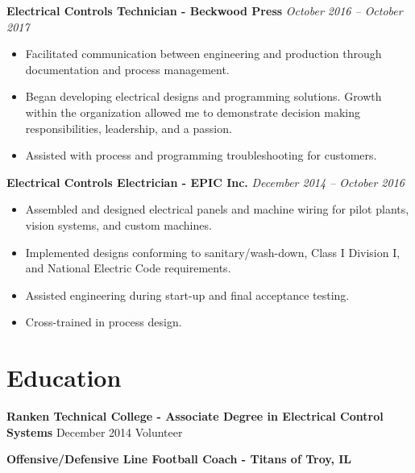 \documentclass[letterpaper,10pt]{article} %
\newcommand{\job}[3]{
\textbf{#1 - #2} \hfill \textit{#3}
}
\newcommand{\education}[4]{
  \textbf{#1 - #2} \hfill #3
}
\begin{document}
\noindent\job{Electrical Controls Technician}{Beckwood Press}{October 2016 – October 2017}
\begin{itemize}[left=2em]
	\item Facilitated communication between engineering and production through documentation and process management.
	\item Began developing electrical designs and programming solutions. Growth within the organization allowed me to demonstrate
	decision making responsibilities, leadership, and a passion.
	\item Assisted with process and programming troubleshooting for customers.
\end{itemize}

\noindent\job{Electrical Controls Electrician}{EPIC Inc.}{December 2014 – October 2016}
\begin{itemize}[left=2em]
	\item Assembled and designed electrical panels and machine wiring for pilot plants, vision systems, and custom machines.
	\item Implemented designs conforming to sanitary/wash-down, Class I Division I, and National Electric Code requirements.
	\item Assisted engineering during start-up and final acceptance testing.
	\item Cross-trained in process design.
\end{itemize}

\section{Education}
\education{Ranken Technical College}{Associate Degree in Electrical Control Systems}{December 2014}

\section{Volunteer}
\job{Offensive/Defensive Line Football Coach}{Titans of Troy, IL}{}
\end{document}

